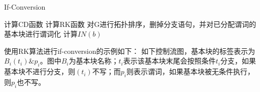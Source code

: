 \begin{algorithm}[H]
	\label{alg:ifcvt}
	\caption{If-Conversion}
	计算CD函数\;
	计算RK函数\;
	对G进行拓扑排序，删掉分支语句，并对已分配谓词的基本块进行谓词化\;
	计算$IN\left(b\right)$\;
\end{algorithm}

使用RK算法进行if-conversion的示例如下：
如下控制流图，基本块的标签表示为$B_i\left(t_i\right)\&p_i$。图中$B_i$为基本块名称；$t_i$表示该基本块末尾会按照条件$t_i$分支，如果基本块不进行分支，则$\left(t_i\right)$不写；而$p_i$则表示谓词，如果基本块被无条件执行，则$p_i$也不写。

